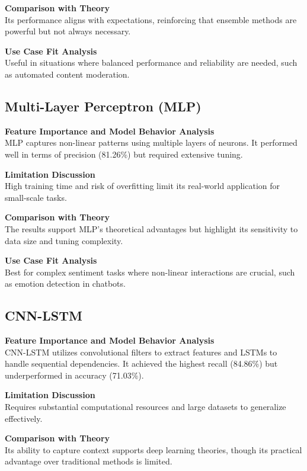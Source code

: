 \textbf{Comparison with Theory} \\
Its performance aligns with expectations, reinforcing that ensemble methods are powerful but not always necessary.

\textbf{Use Case Fit Analysis} \\
Useful in situations where balanced performance and reliability are needed, such as automated content moderation.

\subsection{Multi-Layer Perceptron (MLP)}

\textbf{Feature Importance and Model Behavior Analysis} \\
MLP captures non-linear patterns using multiple layers of neurons. It performed well in terms of precision (81.26\%) but required extensive tuning.

\textbf{Limitation Discussion} \\
High training time and risk of overfitting limit its real-world application for small-scale tasks.

\textbf{Comparison with Theory} \\
The results support MLP’s theoretical advantages but highlight its sensitivity to data size and tuning complexity.

\textbf{Use Case Fit Analysis} \\
Best for complex sentiment tasks where non-linear interactions are crucial, such as emotion detection in chatbots.

\subsection{CNN-LSTM}

\textbf{Feature Importance and Model Behavior Analysis} \\
CNN-LSTM utilizes convolutional filters to extract features and LSTMs to handle sequential dependencies. It achieved the highest recall (84.86\%) but underperformed in accuracy (71.03\%).

\textbf{Limitation Discussion} \\
Requires substantial computational resources and large datasets to generalize effectively.

\textbf{Comparison with Theory} \\
Its ability to capture context supports deep learning theories, though its practical advantage over traditional methods is limited.

